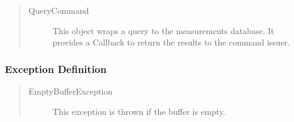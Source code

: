 \begin{quote}
	\begin{description}
		\item[QueryCommand] This object wraps a query to the measurements database. It
		provides a Callback to return the results to the command issuer.
	\end{description} 
\end{quote}

\subsubsection{Exception Definition}

\begin{quote}
	\begin{description}
		\item[EmptyBufferException] This exception is thrown if the buffer is empty.
	\end{description} 
\end{quote}

